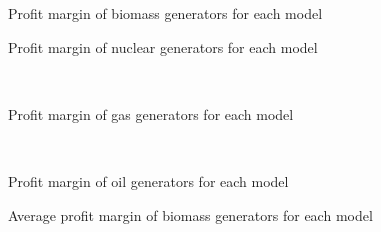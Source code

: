 \begin{minipage}{0.495\textwidth} 
\begin{figure}[H]
    \centering
    \setlength\fheight{4cm}
    \setlength{}
    
    \caption{Profit margin of biomass generators for each model}
    \label{fig:biomass}
\end{figure}
\end{minipage}
\begin{minipage}{0.495\textwidth} 
\begin{figure}[H]
    \centering
    \setlength\fheight{4cm}
    \setlength{}
    
    \caption{Profit margin of nuclear generators for each model}
    \label{fig:nuclear}
\end{figure}
\end{minipage}\\
\begin{minipage}{\textwidth} 
\begin{figure}[H]
    \centering
    \setlength\fheight{4cm}
    \setlength{}
    
        \caption{Profit margin of gas generators for each model}
    \label{fig:gas}
\end{figure}
\end{minipage} \\
\begin{minipage}{0.495\textwidth} 
\begin{figure}[H]
    \centering
    \setlength\fheight{4cm}
    \setlength{}
    
        \caption{Profit margin of oil generators for each model}
    \label{fig:oil}
\end{figure}
\end{minipage}
\begin{minipage}{0.495\textwidth} 
\begin{figure}[H]
    \centering
    \setlength\fheight{4cm}
    \setlength{}
    
        \caption{Average profit margin of biomass generators for each model}
    \label{fig:margin}
\end{figure}
\end{minipage}

